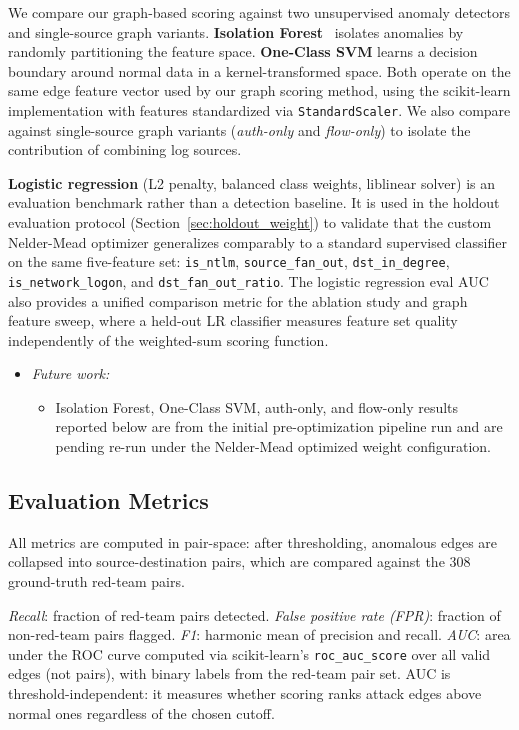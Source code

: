 \documentclass[letterpaper,twocolumn,10pt]{article}
\begin{document}
We compare our graph-based scoring against two unsupervised anomaly detectors and single-source graph variants. \textbf{Isolation Forest}~\cite{isoforest} isolates anomalies by randomly partitioning the feature space. \textbf{One-Class SVM} learns a decision boundary around normal data in a kernel-transformed space. Both operate on the same edge feature vector used by our graph scoring method, using the scikit-learn implementation with features standardized via \texttt{StandardScaler}. We also compare against single-source graph variants (\emph{auth-only} and \emph{flow-only}) to isolate the contribution of combining log sources.

\textbf{Logistic regression} (L2 penalty, balanced class weights, liblinear solver) is an evaluation benchmark rather than a detection baseline. It is used in the holdout evaluation protocol (Section~\ref{sec:holdout_weight}) to validate that the custom Nelder-Mead optimizer generalizes comparably to a standard supervised classifier on the same five-feature set: \texttt{is\_ntlm}, \texttt{source\_fan\_out}, \texttt{dst\_in\_degree}, \texttt{is\_network\_logon}, and \texttt{dst\_fan\_out\_ratio}. The logistic regression eval AUC also provides a unified comparison metric for the ablation study and graph feature sweep, where a held-out LR classifier measures feature set quality independently of the weighted-sum scoring function.

\begin{itemize}
\item \textit{Future work:}
\begin{itemize}
\item Isolation Forest, One-Class SVM, auth-only, and flow-only results reported below are from the initial pre-optimization pipeline run and are pending re-run under the Nelder-Mead optimized weight configuration.
\end{itemize}
\end{itemize}

\subsection{Evaluation Metrics}

All metrics are computed in pair-space: after thresholding, anomalous edges are collapsed into source-destination pairs, which are compared against the 308 ground-truth red-team pairs.

\emph{Recall}: fraction of red-team pairs detected. \emph{False positive rate (FPR)}: fraction of non-red-team pairs flagged. \emph{F1}: harmonic mean of precision and recall. \emph{AUC}: area under the ROC curve computed via scikit-learn's \texttt{roc\_auc\_score} over all valid edges (not pairs), with binary labels from the red-team pair set. AUC is threshold-independent: it measures whether scoring ranks attack edges above normal ones regardless of the chosen cutoff.
\end{document}
